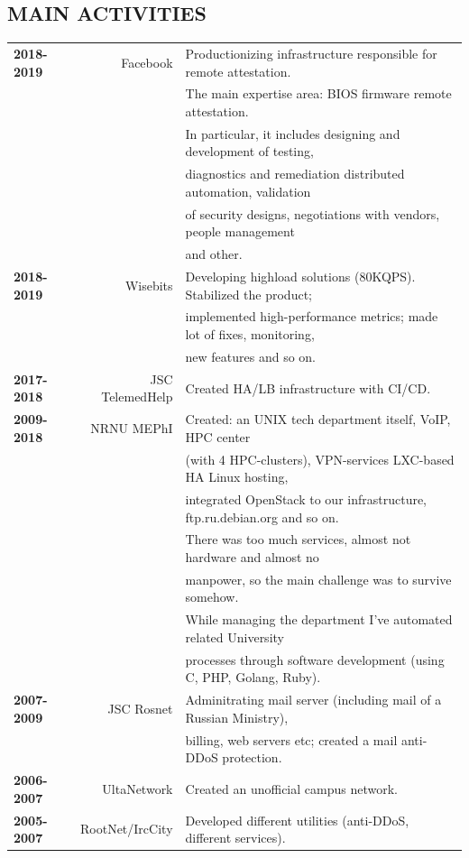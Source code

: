\begin{resume}
\section{MAIN ACTIVITIES}
\vspace{0.1in} 
\begin{tabular}{lrl}
    {\bf 2018-2019} & Facebook        & Productionizing infrastructure responsible for remote attestation.\\
                    &                 & The main expertise area: BIOS firmware remote attestation.\\
                    &                 & In particular, it includes designing and development of testing,\\
                    &                 & diagnostics and remediation distributed automation, validation\\
                    &                 & of security designs, negotiations with vendors, people management\\
                    &                 & and other.\\
    {\bf 2018-2019} & Wisebits        & Developing highload solutions (80KQPS). Stabilized the product;\\
                    &                 & implemented high-performance metrics; made lot of fixes, monitoring,\\
                    &                 & new features and so on.\\
    {\bf 2017-2018} & JSC TelemedHelp & Created HA/LB infrastructure with CI/CD.\\
    {\bf 2009-2018} & NRNU MEPhI      & Created: an UNIX tech department itself, VoIP, HPC center\\
                    &                 & (with 4 HPC-clusters), VPN-services LXC-based HA Linux hosting,\\
                    &                 & integrated OpenStack to our infrastructure, ftp.ru.debian.org and so on.\\
                    &                 & There was too much services, almost not hardware and almost no\\
                    &                 & manpower, so the main challenge was to survive somehow.\\
                    &                 & While managing the department I've automated related University\\
                    &                 & processes through software development (using C, PHP, Golang, Ruby).\\
    {\bf 2007-2009} & JSC Rosnet      & Adminitrating mail server (including mail of a Russian Ministry),\\
                    &                 & billing, web servers etc; created a mail anti-DDoS protection.\\
    {\bf 2006-2007} & UltaNetwork     & Created an unofficial campus network.\\
    {\bf 2005-2007} & RootNet/IrcCity & Developed different utilities (anti-DDoS, different services).\\
\end{tabular}
\end{resume}
